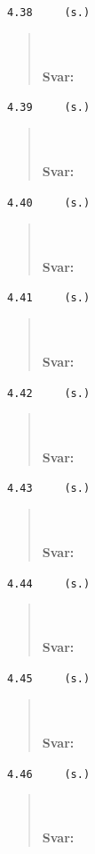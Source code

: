 \documentclass[a4paper]{article}
\newcommand{\tskcol}[1]{\textcolor{tskcol}{#1}}
\begin{document}
\texttt{\tskcol{4.38~~~~ (s.)}}
\begin{quotation}
	\noindent
	\\ \\
	\textbf{Svar:}
\end{quotation}

\texttt{\tskcol{4.39~~~~ (s.)}}
\begin{quotation}
	\noindent
	\\ \\
	\textbf{Svar:}
\end{quotation}

\texttt{\tskcol{4.40~~~~ (s.)}}
\begin{quotation}
	\noindent
	\\ \\
	\textbf{Svar:}
\end{quotation}

\texttt{\tskcol{4.41~~~~ (s.)}}
\begin{quotation}
	\noindent
	\\ \\
	\textbf{Svar:}
\end{quotation}

\texttt{\tskcol{4.42~~~~ (s.)}}
\begin{quotation}
	\noindent
	\\ \\
	\textbf{Svar:}
\end{quotation}

\texttt{\tskcol{4.43~~~~ (s.)}}
\begin{quotation}
	\noindent
	\\ \\
	\textbf{Svar:}
\end{quotation}

\texttt{\tskcol{4.44~~~~ (s.)}}
\begin{quotation}
	\noindent
	\\ \\
	\textbf{Svar:}
\end{quotation}

\texttt{\tskcol{4.45~~~~ (s.)}}
\begin{quotation}
	\noindent
	\\ \\
	\textbf{Svar:}
\end{quotation}

\texttt{\tskcol{4.46~~~~ (s.)}}
\begin{quotation}
	\noindent
	\\ \\
	\textbf{Svar:}
\end{quotation}
\end{document}
